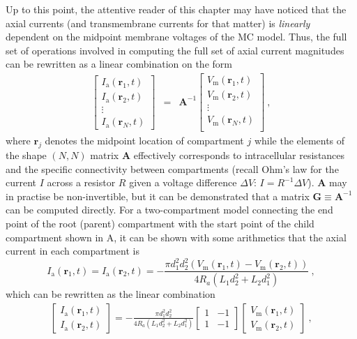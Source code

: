 Up to this point, the attentive reader of this chapter may have noticed that the axial currents (and transmembrane currents for that matter) is \textit{linearly} dependent on the midpoint membrane voltages of the MC model.
Thus, the full set of operations involved in computing the full set of axial current magnitudes can be rewritten as a linear combination on the form
%
\begin{eqnarray}
\begin{bmatrix}
I_\mathrm{a}(\mathbf{r}_1, t)\\
I_\mathrm{a}(\mathbf{r}_2, t)\\
\vdots \\
I_\mathrm{a}(\mathbf{r}_N, t)
\end{bmatrix}
&=& \mathbf{A}^{-1}
\begin{bmatrix}
V_\mathrm{m}(\mathbf{r}_1, t)\\
V_\mathrm{m}(\mathbf{r}_2, t)\\
\vdots \\
V_\mathrm{m}(\mathbf{r}_N, t)\\
\end{bmatrix} ~,
\label{eq:LFPy_linear_combination}
\end{eqnarray}
%
where $\mathbf{r}_j$ denotes the midpoint location of compartment $j$ while the elements of the shape $(N, N)$ matrix $\mathbf{A}$ effectively corresponds to intracellular resistances and the specific connectivity between compartments
(recall Ohm's law for the current $I$ across a resistor $R$ given a voltage difference $\Delta V$: $I=R^{-1} \Delta V$).
$\mathbf{A}$ may in practise be non-invertible,
but it can be demonstrated that a matrix $\mathbf{G}\equiv \mathbf{A}^{-1}$ can be computed directly.
%
For a two-compartment model connecting the end point of the root (parent) compartment with the start point of the child compartment shown in A,
it can be shown with some arithmetics that the axial current in each compartment is 
%
\begin{equation}
I_\mathrm{a}(\mathbf{r}_1, t) = I_\mathrm{a}(\mathbf{r}_2, t) =
	- \frac{\pi d_{1}^{2} d_{2}^{2} \left(V_\mathrm{m}(\mathbf{r}_1, t) - V_\mathrm{m}(\mathbf{r}_2, t) \right)}{4 R_{a} \left(L_{1} d_{2}^{2} + L_{2} d_{1}^{2}\right)} ~,
\end{equation}
%
which can be rewritten as the linear combination
%
\begin{eqnarray}
\begin{bmatrix}
I_\mathrm{a}(\mathbf{r}_1, t)\\
I_\mathrm{a}(\mathbf{r}_2, t)
\end{bmatrix}
=
- \frac{\pi d_{1}^{2} d_{2}^{2}}{4 R_{a} \left(L_{1} d_{2}^{2} + L_{2} d_{1}^{2}\right)}
\begin{bmatrix}
1 & -1 \\
1 & -1
\end{bmatrix}
\begin{bmatrix}
V_\mathrm{m}(\mathbf{r}_1, t) \\
V_\mathrm{m}(\mathbf{r}_2, t)
\end{bmatrix} ~,
\end{eqnarray}
